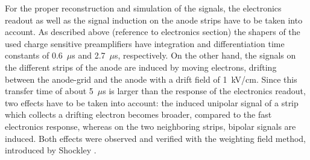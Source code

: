 For the proper reconstruction and simulation of the signals, the
electronics readout as well as the signal induction on the anode
strips have
to be taken into account. As described above (reference to electronics
section) the shapers of the used charge sensitive preamplifiers have
integration and differentiation time constants of 0.6~$\mu$s and
2.7~$\mu$s, respectively. On the other hand, the signals on the
different strips of the anode are induced by moving electrons,
drifting between the anode-grid and the anode with a drift field of
1~kV/cm. Since this transfer time of about 5~$\mu$s is larger than the
response of the electronics readout, two effects have to be taken into
account: the induced unipolar signal of a strip which collects a
drifting electron becomes broader, compared to the fast electronics
response, whereas on the two neighboring strips, bipolar signals are
induced. Both effects were observed and verified with the weighting
field method, introduced by Shockley \cite{ref:induction}.




